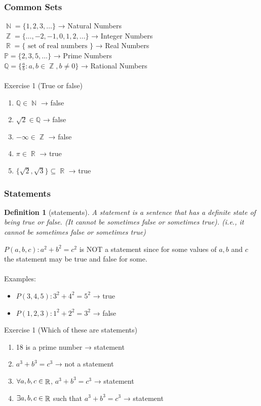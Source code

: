 \documentclass[10pt]{article}
\DeclareMathOperator{\N}{{\mathbb{N}}}
\DeclareMathOperator{\Z}{{\mathbb{Z}}}
\DeclareMathOperator{\R}{{\mathbb{R}}}
\theoremstyle{break}
\newtheorem{defn}{Definition}[subsection]
\begin{document}
\subsubsection{Common Sets}
$\N = \{1, 2, 3, \dots\}$ → Natural Numbers\\
$\Z = \{\dots, -2, -1, 0, 1, 2, \dots\}$ → Integer Numbers\\
$\R = \{\text{ set of real numbers }\}$ → Real Numbers\\
$\mathbb{P} = \{2, 3, 5, \dots \}$ → Prime Numbers\\
$\mathbb{Q} = \{\frac{a}{b}: a, b \in \Z, b \ne 0\}$ → Rational Numbers\\ \vspace{1ex} \\
Exercise 1 (True or false)
\begin{enumerate}
    \item $\mathbb{Q} \in \N$ → false
    \item $\sqrt{2} \in \mathbb{Q}$ → false
    \item $- \infty \in \Z$ → false
    \item $\pi \in \R$ → true
    \item $\{\sqrt{2}, \sqrt{3}\} \subseteq \R$  → true
\end{enumerate}
\subsubsection{Statements}
\begin{defn}[statements]
  A statement is a sentence that has a definite state of being true or false. (It cannot be sometimes false or sometimes true). (i.e., it cannot be sometimes false or sometimes true)  
\end{defn}
$P(a, b, c): a^2 + b^2 = c^2$ is NOT a statement since for some values of $a, b $ and $c $ the statement may be true and false for some. \\ \vspace{1ex}\\
Examples: 
\begin{itemize}
    \item $P(3, 4, 5): 3^2 + 4^2 = 5^2$  → true
    \item $P(1, 2, 3): 1^2 + 2^2 = 3^2$  → false
\end{itemize} 
Exercise 1 (Which of these are statements)
\begin{enumerate}
    \item 18 is a prime number → statement
    \item $a^3 + b^3 = c^3$  → not a statement
    \item $\forall \space a, b, c \in \R$,  $a^3 + b^3 = c^3$  → statement
    \item $\exists \space a, b , c \in \R$ such that $a^3 + b^3 = c^3$ → statement
\end{enumerate}
\end{document}
